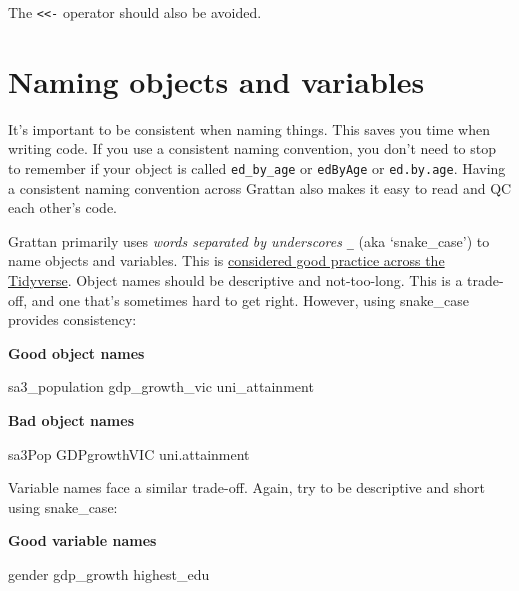 \documentclass[]{book}
\newenvironment{Shaded}{\begin{snugshade}}{\end{snugshade}}
\newcommand{\NormalTok}[1]{#1}
\begin{document}
The \texttt{\textless{}\textless{}-} operator should also be avoided.

\hypertarget{naming-objects-and-variables}{%
\section{Naming objects and variables}\label{naming-objects-and-variables}}

It's important to be consistent when naming things. This saves you time when writing code. If you use a consistent naming convention, you don't need to stop to remember if your object is called \texttt{ed\_by\_age} or \texttt{edByAge} or \texttt{ed.by.age}. Having a consistent naming convention across Grattan also makes it easy to read and QC each other's code.

Grattan primarily uses \emph{words separated by underscores} \texttt{\_} (aka `snake\_case') to name objects and variables. This is \href{https://style.tidyverse.org/syntax.html\#object-names}{considered good practice across the Tidyverse}.
Object names should be descriptive and not-too-long. This is a trade-off, and one that's sometimes hard to get right. However, using snake\_case provides consistency:

\textbf{Good object names}

\begin{Shaded}
\begin{Highlighting}[]
\NormalTok{sa3_population}
\NormalTok{gdp_growth_vic}
\NormalTok{uni_attainment}
\end{Highlighting}
\end{Shaded}

\textbf{Bad object names}

\begin{Shaded}
\begin{Highlighting}[]
\NormalTok{sa3Pop}
\NormalTok{GDPgrowthVIC}
\NormalTok{uni.attainment}
\end{Highlighting}
\end{Shaded}

Variable names face a similar trade-off. Again, try to be descriptive and short using snake\_case:

\textbf{Good variable names}

\begin{Shaded}
\begin{Highlighting}[]
\NormalTok{gender}
\NormalTok{gdp_growth}
\NormalTok{highest_edu}
\end{Highlighting}
\end{Shaded}
\end{document}
